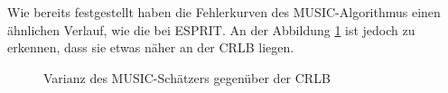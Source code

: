Wie bereits festgestellt haben die Fehlerkurven des \gls{MUSIC}-Algorithmus einen ähnlichen Verlauf, wie die bei \gls{ESPRIT}. An der Abbildung \ref{fig:MUSIC_CRLB_vergleich} ist jedoch zu erkennen, dass sie etwas näher an der \gls{CRLB} liegen.  

\begin{figure}[htbp]
	\centering
	\caption{Varianz des \gls{MUSIC}-Schätzers gegenüber der \gls{CRLB}}
	\label{fig:MUSIC_CRLB_vergleich}
\end{figure}

